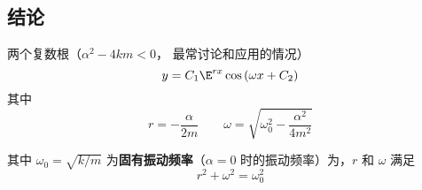 
\subsection{结论}
两个复数根（${\alpha ^2} - 4km < 0$， 最常讨论和应用的情况）
\begin{equation}
y = {C_1}{\E^{rx}}\cos \left( {\omega x + {C_2}} \right)
\end{equation}
其中
\begin{equation}
r =  - \frac{\alpha }{{2m}} \qquad  \omega  = \sqrt {\omega _0^2 - \frac{{{\alpha ^2}}}{{4{m^2}}}}
\end{equation}

其中 ${\omega _0} = \sqrt {{k}/{m}}$ 为\textbf{固有振动频率}（$\alpha  = 0$ 时的振动频率）为，$r$ 和 $\omega$ 满足
\begin{equation}
{r^2} + {\omega ^2} = \omega _0^2
\end{equation}

